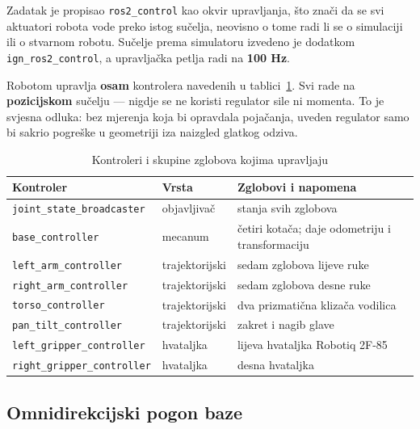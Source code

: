 \documentclass[12pt,a4paper]{article}
\begin{document}
Zadatak je propisao \texttt{ros2\_control} kao okvir upravljanja, što znači da se svi aktuatori
robota vode preko istog sučelja, neovisno o tome radi li se o simulaciji ili o stvarnom robotu.
Sučelje prema simulatoru izvedeno je dodatkom \texttt{ign\_ros2\_control}, a upravljačka petlja
radi na \textbf{100 Hz}.

Robotom upravlja \textbf{osam} kontrolera navedenih u tablici~\ref{tab:kontroleri}. Svi rade na
\textbf{pozicijskom} sučelju --- nigdje se ne koristi regulator sile ni momenta. To je svjesna
odluka: bez mjerenja koja bi opravdala pojačanja, uveden regulator samo bi sakrio pogreške u
geometriji iza naizgled glatkog odziva.

\begin{table}[!htbp]
    \centering
    \caption{Kontroleri i skupine zglobova kojima upravljaju}
    \label{tab:kontroleri}
    \scriptsize
    \begin{tabularx}{\textwidth}{@{}l l X@{}}
        \toprule
        \textbf{Kontroler} & \textbf{Vrsta} & \textbf{Zglobovi i napomena} \\
        \midrule
        \texttt{joint\_state\_broadcaster} & objavljivač & stanja svih zglobova \\
        \texttt{base\_controller}          & mecanum     & četiri kotača; daje odometriju i transformaciju \\
        \texttt{left\_arm\_controller}     & trajektorijski & sedam zglobova lijeve ruke \\
        \texttt{right\_arm\_controller}    & trajektorijski & sedam zglobova desne ruke \\
        \texttt{torso\_controller}         & trajektorijski & dva prizmatična klizača vodilica \\
        \texttt{pan\_tilt\_controller}     & trajektorijski & zakret i nagib glave \\
        \texttt{left\_gripper\_controller} & hvataljka   & lijeva hvataljka Robotiq 2F-85 \\
        \texttt{right\_gripper\_controller}& hvataljka   & desna hvataljka \\
        \bottomrule
    \end{tabularx}
\end{table}

\subsection{Omnidirekcijski pogon baze}
\end{document}
